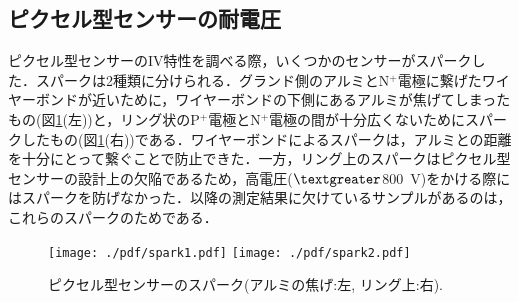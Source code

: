 \subsection{ピクセル型センサーの耐電圧}
\label{sub:weak}
ピクセル型センサーのIV特性を調べる際，いくつかのセンサーがスパークした．スパークは2種類に分けられる．グランド側のアルミとN$^{+}$電極に繋げたワイヤーボンドが近いために，ワイヤーボンドの下側にあるアルミが焦げてしまったもの(図\ref{fig:spark}(左))と，リング状のP$^{+}$電極とN$^{+}$電極の間が十分広くないためにスパークしたもの(図\ref{fig:spark}(右))である．ワイヤーボンドによるスパークは，アルミとの距離を十分にとって繋ぐことで防止できた．一方，リング上のスパークはピクセル型センサーの設計上の欠陥であるため，高電圧($\textgreater$800~V)をかける際にはスパークを防げなかった．以降の測定結果に欠けているサンプルがあるのは，これらのスパークのためである．
\begin{figure}[H]
	\centering
	\texttt{[image: ./pdf/spark1.pdf]}
	\texttt{[image: ./pdf/spark2.pdf]}
	\caption{ピクセル型センサーのスパーク(アルミの焦げ:左, リング上:右).}
	\label{fig:spark}
\end{figure}
